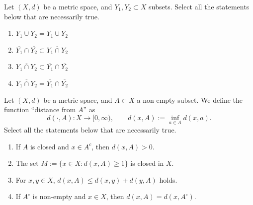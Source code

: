 \begin{exercise}
\label{ex:closure_multiple_choice}
Let $(X,d)$ be a metric space, and $Y_1, Y_2 \subset X$ subsets. Select all the statements below
that are necessarily true.
\begin{enumerate}[label=\textbf{(\alph*)}]
  \item $\overline{Y_1 \cup Y_2} = \overline{Y_1} \cup \overline{Y_2}$
  \item $\overline{Y_1} \cap \overline{Y_2} \subset \overline{Y_1 \cap Y_2}$
  \item $\overline{Y_1 \cap Y_2} \subset \overline{Y_1} \cap \overline{Y_2}$
  \item $\overline{Y_1 \cap Y_2} = \overline{Y_1} \cap \overline{Y_2}$
\end{enumerate}
\end{exercise}


\begin{exercise}
\label{ex:distance_from_set_multiple_choice}
Let $(X,d)$ be a metric space, and $A \subset X$ a non-empty subset. We define the function
``distance from $A$'' as
\[
  d(\cdot, A) : X \to [0,\infty), \qquad d(x,A) := \inf_{a \in A} d(x,a).
\]
Select all the statements below that are necessarily true.
\begin{enumerate}[label=\textbf{(\alph*)}]
  \item If $A$ is closed and $x \in A^c$, then $d(x,A) > 0$.
  \item The set $M := \{x \in X : d(x,A) \geq 1\}$ is closed in $X$.
  \item For $x, y \in X$, $d(x,A) \leq d(x,y) + d(y,A)$ holds.
  \item If $A^\circ$ is non-empty and $x \in X$, then $d(x,A) = d(x, A^\circ)$.
\end{enumerate}
\end{exercise}

